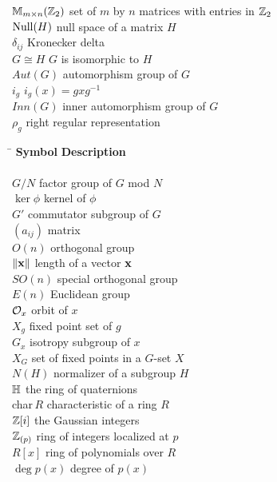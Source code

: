 \begin{tabbing}
${\Bbb M}_{m \times n}({\Bbb Z}_2)$ \>  set of $m$ by $n$ matrices with 
     entries in ${\Bbb Z}_2$ \\
${\rm Null}(H)$ \>  null space of a matrix $H$ \\
$\delta_{ij}$ \>  Kronecker delta \\
$G \cong H$ \>  $G$ is isomorphic to $H$ \\
$Aut(G)$ \>  automorphism group of $G$ \\
$i_g$ \>  $i_g(x) = gxg^{-1}$ \\
$Inn(G)$ \>  inner automorphism group of $G$ \\
$\rho_g$ \>  right regular representation \\
\end{tabbing} \clearpage
\begin{tabbing}
\hspace{1.9775in} \= \kill
{\bf Symbol}  \>  {\bf Description} \\
     \mbox{\hspace*{1in}} \\
$G/N$ \>  factor group of $G$ mod $N$ \\
$\ker \phi$ \>  kernel of $\phi$ \\
$G'$ \>  commutator subgroup of $G$ \\
$(a_{ij})$ \>  matrix \\
$O(n)$ \>  orthogonal group \\
$\| {\bold x} \|$ \>  length of a vector ${\bold x}$ \\
$SO(n)$ \>  special orthogonal group \\
$E(n)$ \>  Euclidean group \\
${\cal O}_x$ \>  orbit of $x$ \\
$X_g$ \>  fixed point set of $g$ \\
$G_x$ \>  isotropy subgroup of $x$ \\
$X_G$ \>  set of fixed points in a $G$-set $X$ \\
$N(H)$ \>  normalizer of a subgroup $H$ \\
${\Bbb H}$ \>  the ring of quaternions \\
\mbox{char$\, R$} \>  characteristic of a ring $R$ \\
${\Bbb Z}[i ]$ \>  the Gaussian integers \\
${\Bbb Z}_{(p)}$ \>  ring of integers localized at $p$ \\
$R[x]$ \>  ring of polynomials over $R$ \\
$\deg p(x)$ \>  degree of $p(x)$ \\

\end{tabbing}
